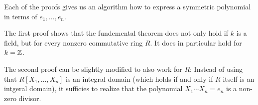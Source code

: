 \begin{remark}
  Each of the proofs gives us an algorithm how to express a symmetric polynomial in terms of $e_1, \dotsc, e_n$.
\end{remark}


\begin{remark}
  The first proof shows that the fundemental theorem does not only hold if $k$ is a field, but for every nonzero commutative ring $R$.
  It does in particular hold for $k = \mathbb{Z}$.
  
  The second proof can be slightly modified to also work for $R$:
  Instead of using that $R[X_1, \dotsc, X_n]$ is an integral domain (which holds if and only if $R$ itself is an intgeral domain), it sufficies to realize that the polynomial $X_1 \dotsm X_n = e_n$ is a non-zero divisor.
\end{remark}


